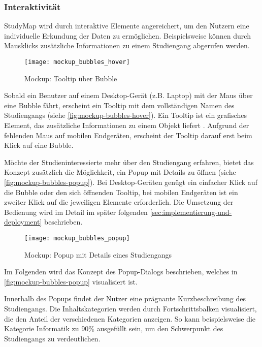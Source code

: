 \subsubsection{Interaktivität}
StudyMap wird durch interaktive Elemente angereichert, um den Nutzern eine individuelle Erkundung der Daten zu ermöglichen. Beispielsweise können durch Mausklicks zusätzliche Informationen zu einem Studiengang abgerufen werden.

\begin{figure}[H]
    \centering
    \texttt{[image: mockup\_bubbles\_hover]}
    \caption{Mockup: Tooltip über Bubble}
    \label{fig:mockup-bubbles-hover}
\end{figure}

Sobald ein Benutzer auf einem Desktop-Gerät (z.B. Laptop) mit der Maus über eine
Bubble fährt, erscheint ein Tooltip mit dem vollständigen Namen des Studiengangs
(siehe \autoref{fig:mockup-bubbles-hover}). Ein Tooltip ist ein grafisches
Element, das zusätzliche Informationen zu einem Objekt liefert \parencite{joyce_tooltip_2019}. Aufgrund der fehlenden Maus auf
mobilen Endgeräten, erscheint der Tooltip darauf erst beim Klick auf eine
Bubble. 

Möchte der Studieninteressierte mehr über den Studiengang erfahren, bietet das Konzept zusätzlich die Möglichkeit, ein Popup mit Details zu öffnen (siehe \autoref{fig:mockup-bubbles-popup}). Bei Desktop-Geräten genügt ein einfacher Klick auf die Bubble oder den sich öffnenden Tooltip, bei mobilen Endgeräten ist ein zweiter Klick auf die jeweiligen Elemente erforderlich. Die Umsetzung der Bedienung wird im Detail im später folgenden \autoref{sec:implementierung-und-deployment} beschrieben.

\begin{figure}[H]
    \centering
    \texttt{[image: mockup\_bubbles\_popup]}
    \caption{Mockup: Popup mit Details eines Studiengangs}
    \label{fig:mockup-bubbles-popup}
\end{figure}

Im Folgenden wird das Konzept des Popup-Dialogs beschrieben, welches in \autoref{fig:mockup-bubbles-popup} visualisiert ist.

Innerhalb des Popups findet der Nutzer eine prägnante Kurzbeschreibung des Studiengangs. Die Inhaltskategorien werden durch Fortschrittsbalken visualisiert, die den Anteil der verschiedenen Kategorien anzeigen. So kann beispielsweise die Kategorie \glqq Informatik\grqq{} zu 90\% ausgefüllt sein, um den Schwerpunkt des Studiengangs zu verdeutlichen.

